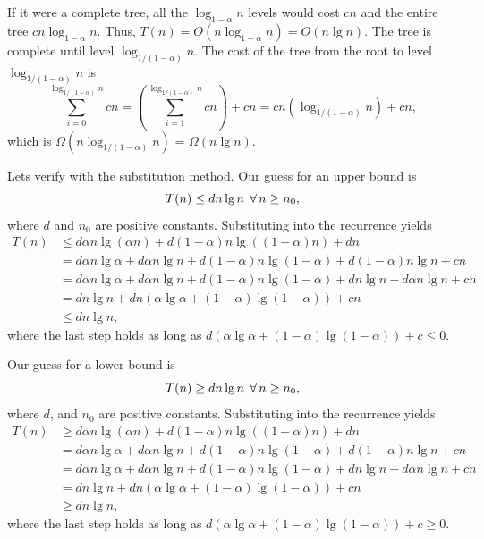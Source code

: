 \begin{enumerate}
\begin{framed}
If it were a complete tree, all the $\log_{1 - \alpha} n$ levels would cost $cn$
and the entire tree $cn \log_{1 - \alpha} n$. Thus,
$T(n) = O(n \log_{1 - \alpha} n) = O(n \lg n)$. The tree is complete until level
$\log_{1/(1 - \alpha)} n$. The cost of the tree from the root to level
$\log_{1/(1 - \alpha)} n$ is
\[
  \sum_{i = 0}^{\log_{1/(1 - \alpha)} n} cn
  = \left(\sum_{i = 1}^{\log_{1/(1 - \alpha)} n} cn\right) + cn
  = cn (\log_{1/(1 - \alpha)} n) + cn,
\]
which is $\Omega(n \log_{1/(1 - \alpha)} n)$ = $\Omega(n \lg n)$.

Lets verify with the substitution method. Our guess for an upper bound is
\[
T(n) \le d n \lg n \; \operatorname{\forall} n \ge n_0,
\]
where $d$ and $n_0$ are positive constants. Substituting into the
recurrence yields
\begin{equation*}
\begin{aligned}
  T(n) &\le d \alpha n \lg (\alpha n) + d (1 - \alpha) n \lg ((1 - \alpha) n) + dn\\
       &=   d \alpha n \lg \alpha + d \alpha n \lg n + d (1 - \alpha) n \lg (1 - \alpha) + d (1 - \alpha) n \lg n + cn\\
       &=   d \alpha n \lg \alpha + d \alpha n \lg n + d (1 - \alpha) n \lg (1 - \alpha) + d n \lg n - d \alpha n \lg n + cn\\
       &=   d n \lg n + dn (\alpha \lg \alpha + (1 - \alpha) \lg (1 - \alpha)) + cn\\
       &\le d n \lg n,
\end{aligned}
\end{equation*}
where the last step holds as long as $d(\alpha \lg \alpha + (1 - \alpha) \lg (1 - \alpha)) + c \le 0$.

Our guess for a lower bound is
\[
  T(n) \ge d n \lg n \; \operatorname{\forall} n \ge n_0,
\]
where $d$, and $n_0$ are positive constants. Substituting into the
recurrence yields
\begin{equation*}
\begin{aligned}
  T(n) &\ge d \alpha n \lg (\alpha n) + d (1 - \alpha) n \lg ((1 - \alpha) n) + dn\\
       &=   d \alpha n \lg \alpha + d \alpha n \lg n + d (1 - \alpha) n \lg (1 - \alpha) + d (1 - \alpha) n \lg n + cn\\
       &=   d \alpha n \lg \alpha + d \alpha n \lg n + d (1 - \alpha) n \lg (1 - \alpha) + d n \lg n - d \alpha n \lg n + cn\\
       &=   d n \lg n + dn (\alpha \lg \alpha + (1 - \alpha) \lg (1 - \alpha)) + cn\\
       &\ge d n \lg n,
\end{aligned}
\end{equation*}
where the last step holds as long as $d(\alpha \lg \alpha + (1 - \alpha) \lg (1 - \alpha)) + c \ge 0$.
\end{framed}

\end{enumerate}

